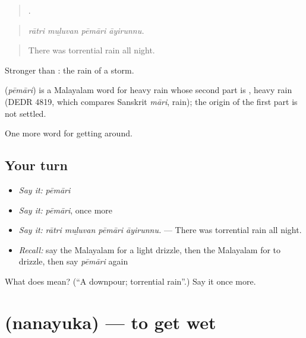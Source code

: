 \begin{quote}
   .
\end{quote}

\begin{quote}
\emph{rātri muḻuvan pēmāri āyirunnu.}
\end{quote}

\begin{quote}
There was torrential rain all night.
\end{quote}

Stronger than : the rain of a storm.

\begin{cousinweb}
\textbf{} (\emph{pēmāri}) is a Malayalam word for heavy rain whose second part is , heavy rain (DEDR 4819, which compares Sanskrit \emph{māri}, rain); the origin of the first part is not settled.
\end{cousinweb}

\begin{grammarlens}[title={What you've built}]
One more word for getting around.
\end{grammarlens}

\subsection*{Your turn}
\begin{itemize}
\raggedright
  \item \emph{Say it:} \emph{pēmāri}
  \item \emph{Say it:} \emph{pēmāri}, once more
  \item \emph{Say it:} \emph{rātri muḻuvan pēmāri āyirunnu.} — There was torrential rain all night.
  \item \emph{Recall:} say the Malayalam for a light drizzle, then the Malayalam for to drizzle, then say \emph{pēmāri} again
\end{itemize}

\begin{tcolorbox}[breakable,colback=teal!4,colframe=teal!35!black,title={Before you move on}]
What does  mean? (\textquotedblleft{}A downpour; torrential rain\textquotedblright{}.) Say it once more.
\end{tcolorbox}
\section[\texorpdfstring{\ml{നനയുക} (nanayuka)}{നനയുക (nanayuka)}]{ (nanayuka) — to get wet}

